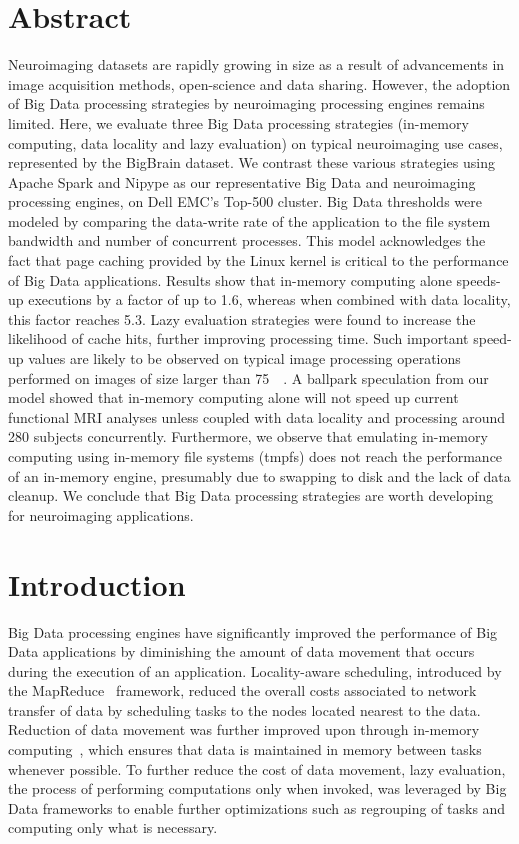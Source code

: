 \section{Abstract}
    Neuroimaging datasets are rapidly growing in size as a result of
    advancements in image acquisition methods, open-science and data sharing.
    However, the adoption of Big Data processing strategies by neuroimaging
    processing engines remains limited. Here, we evaluate three Big Data
    processing strategies (in-memory computing, data locality and lazy
    evaluation) on typical neuroimaging use cases, represented by the BigBrain
    dataset. We contrast these various strategies using Apache Spark and Nipype
    as our representative Big Data and neuroimaging processing engines, on Dell
    EMC's Top-500 cluster. Big Data thresholds were modeled by comparing the
    data-write rate of the application to the file system bandwidth and number of
    concurrent processes. This model acknowledges the fact that page caching
    provided by the Linux kernel is critical to the performance of Big Data
    applications. Results show that in-memory computing alone speeds-up
    executions by a factor of up to 1.6, whereas when combined with data
    locality, this factor reaches 5.3. Lazy evaluation strategies were found to
    increase the likelihood of cache hits, further improving processing time.
    Such important speed-up values are likely to be observed on typical image
    processing operations performed on images of size larger than \SI{75}{\giga\byte}. A
    ballpark speculation from our model showed that in-memory computing alone
    will not speed up current functional MRI analyses unless coupled with data
    locality and processing around 280 subjects concurrently. Furthermore, we
    observe that emulating in-memory computing using in-memory file systems
    (tmpfs) does not reach the performance of an in-memory engine, presumably
    due to swapping to disk and the lack of data cleanup. We conclude that Big
    Data processing strategies are worth developing for neuroimaging
    applications. 

\section{Introduction} %

Big Data processing engines have significantly improved the performance of Big
Data applications by diminishing the amount of data movement that occurs during
the execution of an application. Locality-aware scheduling, introduced by the
MapReduce~\cite{dean2008mapreduce} framework, reduced the overall costs
associated to network transfer of data by scheduling tasks to the nodes located
nearest to the data. Reduction of data movement was further improved upon
through in-memory computing~\cite{zaharia2016apache}, which ensures that data is
maintained in memory between tasks whenever possible. To further reduce the cost
of data movement, lazy evaluation, the process of performing computations only
when invoked, was leveraged by Big Data frameworks to enable further
optimizations such as regrouping of tasks and computing only what is necessary.

